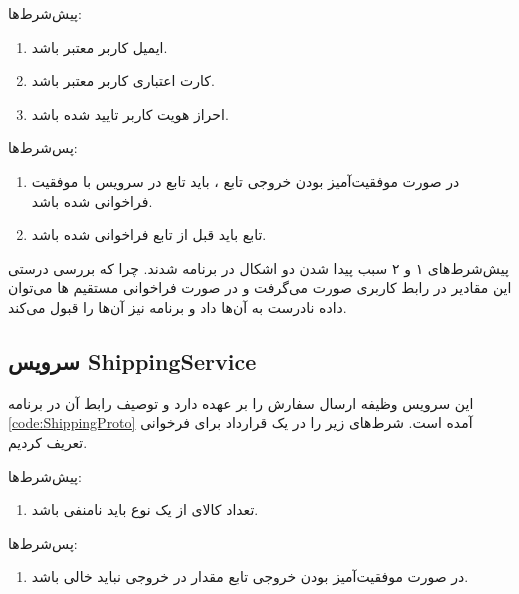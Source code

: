 پیش‌شرط‌ها:
\begin{enumerate}
\item
ایمیل کاربر معتبر باشد.
\item
کارت اعتباری کاربر معتبر باشد.
\item
احراز هویت کاربر تایید شده باشد.
\end{enumerate}

پس‌شرط‌ها:
\begin{enumerate}
\item
در صورت موفقیت‌آمیز بودن خروجی تابع
، باید تابع
در سرویس
با موفقیت فراخوانی شده باشد.
\item
تابع
باید قبل از تابع
فراخوانی شده باشد.
\end{enumerate}

پیش‌شرط‌های ۱ و ۲ سبب پیدا شدن دو اشکال در برنامه شدند. چرا که بررسی درستی این مقادیر در رابط کاربری صورت می‌گرفت و در صورت فراخوانی مستقیم
ها
می‌توان داده نادرست به آن‌ها داد و برنامه نیز آن‌ها را قبول می‌کند.


\subsection{
سرویس ShippingService
}

\singlespacing
\begin{figure}
	\begin{LTR}
		
	\end{LTR}
\end{figure}
\doublespacing

این سرویس وظیفه ارسال سفارش را بر عهده دارد و توصیف رابط آن در برنامه
\ref{code:ShippingProto}
آمده است. شرط‌های زیر را در یک قرارداد برای فرخوانی
تعریف کردیم.

پیش‌شرط‌ها:
\begin{enumerate}
\item
تعداد کالای از یک نوع باید نامنفی باشد.
\end{enumerate}

پس‌شرط‌ها:
\begin{enumerate}
\item
در صورت موفقیت‌آمیز بودن خروجی تابع
مقدار
در خروجی نباید خالی باشد.
\end{enumerate}

